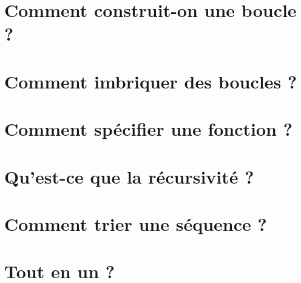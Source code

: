 \documentclass[11pt,a4paper,colorlinks,breaklinks]{article}
\begin{document}
\section{Comment construit-on une boucle ?}\label{sec:boucles}

\newpage
\section{Comment imbriquer des boucles ?}\label{sec:boucles-imbriquees}

\newpage
\section{Comment spécifier une fonction ?}\label{sec:specification}

\newpage
\section{Qu'est-ce que la récursivité ?}\label{sec:recursivite}

\newpage
\section{Comment trier une séquence ?}\label{sec:sequences}

\newpage
\section{Tout en un ?}\label{sec:conclusion}
\end{document}

